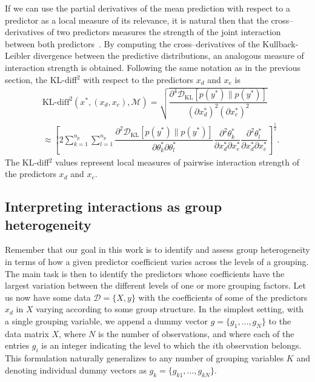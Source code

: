 \documentclass{article}
\begin{document}
%

If we can use the partial derivatives of the mean prediction with respect to a predictor as a local measure of its relevance, it is natural then that the cross--derivatives of two predictors measures the strength of the joint interaction between both predictors~\cite{paananen2019ranking}.
By computing the cross--derivatives of the Kullback-Leibler divergence between the predictive distributions, an analogous measure of interaction strength is obtained.
Following the same notation as in the previous section, the KL-diff$^2$ with respect to the predictors $x_d$ and $x_e$ is
%
%
%
%
%
\begin{align*}
    & \text{KL-diff}^2 ({x^*}, (x_d, x_e), \mathcal{M}) = \sqrt{\dfrac{\partial^4 \mathcal{D}_{\text{KL}} [p(y^*)\| p(y^{*})]}{(\partial x^{*}_d)^2(\partial x_e^{*})^2}} \nonumber\\
    &  \approx \left[ 2 \sum_{k=1}^{n_p}\sum_{l=1}^{n_p}\dfrac{\partial^2 \mathcal{D}_{\text{KL}} [p(y^*)\| p(y^{*})]}{\partial\theta_k^*\partial\theta_l^*} \dfrac{\partial^2\theta_k^*}{\partial x_d^* \partial x_e^*}\dfrac{\partial^2\theta_l^*}{\partial x_d^* \partial x_e^*} \right]^{\frac{1}{2}} .
\end{align*}
%
%
%
The KL-diff$^2$ values represent local measures of pairwise interaction strength of
the predictors $x_d$ and $x_e$.
  
\subsection{Interpreting interactions as group heterogeneity}
\label{sec:multilevel}

Remember that our goal in this work is to identify and assess group heterogeneity in terms of how a given predictor coefficient varies across the levels of a grouping.
The main task is then to identify the predictors whose coefficients have the largest variation between the different levels of one or more grouping factors.
Let us now have some data $\mathcal{D} = \{{X}, {y}\}$ with the coefficients of some of the predictors $x_d$ in ${X}$ varying according to some group structure.
In the simplest setting, with a single grouping variable, we append a dummy vector $g = \{g_1, \ldots, g_N\}$ to the data matrix ${X}$, where $N$ is the number of observations, and where each of the entries $g_i$ is an integer indicating the level to which the $i$th observation belongs.
This formulation naturally generalizes to any number of grouping variables $K$ and denoting individual dummy vectors as $g_k = \{g_{k1}, \ldots, g_{kN}\}$.
\end{document}
